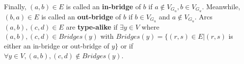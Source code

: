 \documentclass[12pt]{article}
\begin{document}
\begin{definition}
\begin{itemize}
                Finally, \begin{math}(a,b) \in E\end{math} is called an \textbf{in-bridge} of \begin{math}b\end{math} if \begin{math}a \notin V_{G_{u}}, b \in V_{G_{u}}\end{math}. Meanwhile, \begin{math}(b,a) \in E\end{math} is called an \textbf{out-bridge} of \begin{math}b\end{math} if \begin{math}b \in V_{G_{u}}\end{math} and \begin{math}a \notin V_{G_{u}}\end{math}. Arcs \begin{math}(a,b), (c,d) \in E\end{math} are \textbf{type-alike} if \begin{math}\exists y \in V\end{math} where \begin{math}(a,b), (c,d) \in Bridges(y)\end{math} with \begin{math}Bridges(y) = \{(r,s) \in E|(r,s)\end{math} is either an in-bridge or out-bridge of \begin{math}y\}\end{math} or if \begin{math}\forall y \in V, (a,b), (c,d) \notin Bridges(y)\end{math}.
                
            \end{itemize}
            
        \end{definition}
\end{document}

